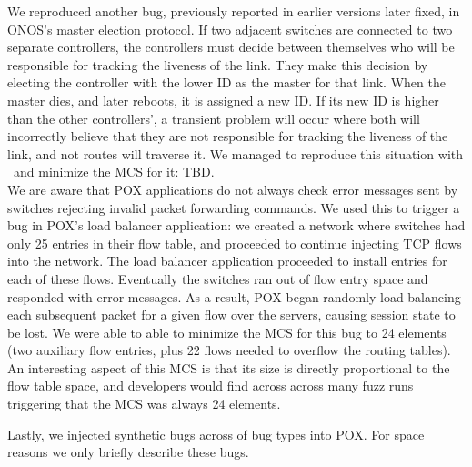  We reproduced another bug,
previously reported in earlier versions later fixed, in
ONOS's master election protocol. If two adjacent switches are connected to two
separate controllers, the controllers must decide between themselves who will
be responsible for tracking the liveness of the link. They make this decision
by electing the controller with the lower ID as the master for that link.
When the master dies, and later reboots, it is assigned a new ID. If
its new ID is higher than the other controllers', a transient problem will
occur where both will incorrectly
believe that they are not responsible for tracking the liveness of the link,
and not routes will traverse it. We managed to reproduce this situation with
\projectname~and minimize the MCS for it: \num{TBD.}\\[0.5ex]
 We are aware that POX
applications do not always check error messages sent by switches
rejecting invalid packet forwarding commands. We used this to trigger a bug in
POX's load balancer application: we created a network where switches had only
25 entries in their flow table, and proceeded to continue injecting TCP flows
into the network. The load balancer application proceeded to install entries
for each of these flows. Eventually the switches ran out of flow entry
space and responded with error messages. As a result, POX began randomly load
balancing each subsequent packet for a given flow over the servers, causing
session state to be lost. We were able to able to minimize the MCS for this
bug to 24 elements (two auxiliary flow entries, plus 22 flows needed to
overflow the routing tables). An interesting aspect of this MCS is that its
size is directly proportional to the flow table space, and developers would
find across across many fuzz runs triggering that the MCS was always 24
elements.


Lastly, we injected synthetic bugs across of bug types into POX. For space
reasons we only briefly describe these bugs.

